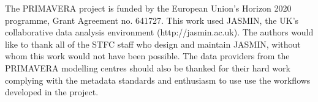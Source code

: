\documentclass[gmd, manuscript]{copernicus}
\begin{document}


\appendixfigures  %

\appendixtables   %







\begin{acknowledgements}
The PRIMAVERA project is funded by the European Union's Horizon 2020 programme, Grant Agreement no. 641727. This work used JASMIN, the UK's collaborative data analysis environment (http://jasmin.ac.uk). The authors would like to thank all of the STFC staff who design and maintain JASMIN, without whom this work would not have been possible. The data providers from the PRIMAVERA modelling centres should also be thanked for their hard work complying with the metadata standards and enthusiasm to use use the workflows developed in the project.
\end{acknowledgements}






%
%
%
\end{document}
